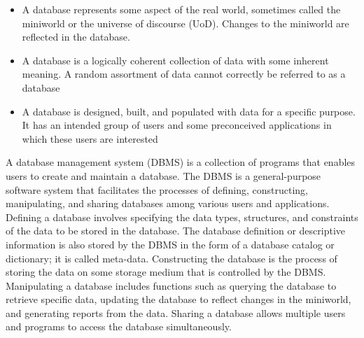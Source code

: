 \begin{itemize}
\item{A database represents some aspect of the real world, sometimes called the miniworld or the universe of discourse (UoD). Changes to the miniworld are reflected in the database.}
\item{A database is a logically coherent collection of data with some inherent meaning. A random assortment of data cannot correctly be referred to as a database}
\item{A database is designed, built, and populated with data for a specific purpose. It has an intended group of users and some preconceived applications in which these users are interested}
\end{itemize}
A database management system (DBMS) is a collection of programs that enables users to create and maintain a database. The DBMS is a general-purpose software system that facilitates the processes of defining, constructing, manipulating, and sharing databases among various users and applications. Defining a database involves specifying the data types, structures, and constraints of the data to be stored in the database. The database definition or descriptive information is also stored by the DBMS in the form of a database catalog or dictionary; it is called meta-data. Constructing the database is the process of storing the data on some storage medium that is controlled by the DBMS. Manipulating a database includes functions such as querying the database to retrieve specific data, updating the database to reflect changes in the miniworld, and generating reports from the data. Sharing a database allows multiple users and programs to access the database simultaneously.


